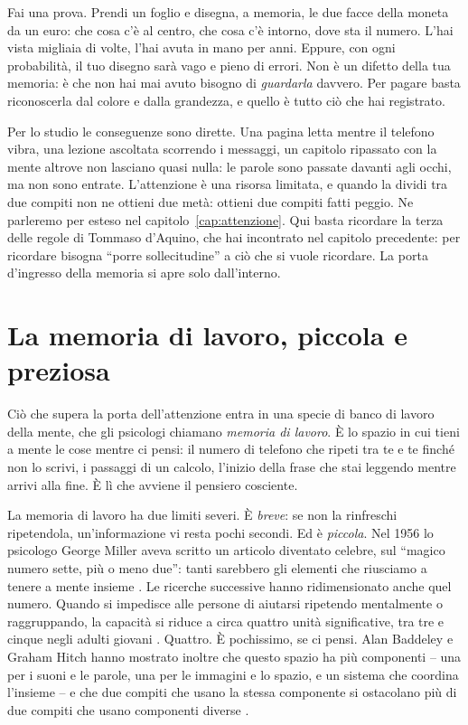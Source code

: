 Fai una prova. Prendi un foglio e disegna, a memoria, le due facce
della moneta da un euro: che cosa c'è al centro, che cosa c'è intorno,
dove sta il numero. L'hai vista migliaia di volte, l'hai avuta in mano
per anni. Eppure, con ogni probabilità, il tuo disegno sarà vago e
pieno di errori. Non è un difetto della tua memoria: è che non hai mai
avuto bisogno di \emph{guardarla} davvero. Per pagare basta
riconoscerla dal colore e dalla grandezza, e quello è tutto ciò che hai
registrato.

Per lo studio le conseguenze sono dirette. Una pagina letta mentre il
telefono vibra, una lezione ascoltata scorrendo i messaggi, un capitolo
ripassato con la mente altrove non lasciano quasi nulla: le parole sono
passate davanti agli occhi, ma non sono entrate. L'attenzione è una
risorsa limitata, e quando la dividi tra due compiti non ne ottieni
due metà: ottieni due compiti fatti peggio. Ne parleremo per esteso nel
capitolo~\ref{cap:attenzione}. Qui basta ricordare la terza delle
regole di Tommaso d'Aquino, che hai incontrato nel capitolo
precedente: per ricordare bisogna \enquote{porre sollecitudine} a ciò
che si vuole ricordare. La porta d'ingresso della memoria si apre solo
dall'interno.

\section{La memoria di lavoro, piccola e preziosa}

Ciò che supera la porta dell'attenzione entra in una specie di
banco di lavoro della mente, che gli psicologi chiamano \emph{memoria di
lavoro}. È lo spazio in cui tieni a mente le cose mentre ci pensi: il
numero di telefono che ripeti tra te e te finché non lo scrivi, i
passaggi di un calcolo, l'inizio della frase che stai leggendo mentre
arrivi alla fine. È lì che avviene il pensiero cosciente.

La memoria di lavoro ha due limiti severi. È \emph{breve}: se non la
rinfreschi ripetendola, un'informazione vi resta pochi secondi. Ed è
\emph{piccola}. Nel 1956 lo psicologo George Miller aveva scritto un
articolo diventato celebre, sul \enquote{magico numero sette, più o meno
due}: tanti sarebbero gli elementi che riusciamo a tenere a mente
insieme \parencite{miller1956}. Le ricerche successive hanno
ridimensionato anche quel numero. Quando si impedisce alle persone di
aiutarsi ripetendo mentalmente o raggruppando, la capacità si riduce a
circa quattro unità significative, tra tre e cinque negli adulti
giovani
\parencite{cowan2001}. Quattro. È pochissimo, se ci pensi.
Alan Baddeley e Graham Hitch hanno mostrato inoltre che questo spazio
ha più componenti -- una per i suoni e le parole, una per le immagini
e lo spazio, e un sistema che coordina l'insieme -- e che due compiti
che usano la stessa componente si ostacolano più di due compiti che
usano componenti diverse \parencite{baddeley1974}.

